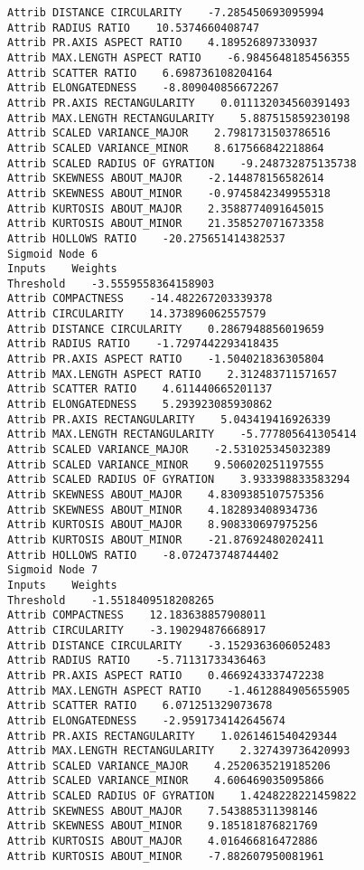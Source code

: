 \documentclass[
	article,			%
	11pt,				%
	oneside,			%
	a4paper,			%
	english,			%
	brazil,				%
	sumario=tradicional
	]{abntex2}
\begin{document}
\begin{lstlisting}
Attrib DISTANCE CIRCULARITY    -7.285450693095994
Attrib RADIUS RATIO    10.5374660408747
Attrib PR.AXIS ASPECT RATIO    4.189526897330937
Attrib MAX.LENGTH ASPECT RATIO    -6.9845648185456355
Attrib SCATTER RATIO    6.698736108204164
Attrib ELONGATEDNESS    -8.809040856672267
Attrib PR.AXIS RECTANGULARITY    0.011132034560391493
Attrib MAX.LENGTH RECTANGULARITY    5.887515859230198
Attrib SCALED VARIANCE_MAJOR    2.7981731503786516
Attrib SCALED VARIANCE_MINOR    8.617566842218864
Attrib SCALED RADIUS OF GYRATION    -9.248732875135738
Attrib SKEWNESS ABOUT_MAJOR    -2.144878156582614
Attrib SKEWNESS ABOUT_MINOR    -0.9745842349955318
Attrib KURTOSIS ABOUT_MAJOR    2.3588774091645015
Attrib KURTOSIS ABOUT_MINOR    21.358527071673358
Attrib HOLLOWS RATIO    -20.275651414382537
Sigmoid Node 6
Inputs    Weights
Threshold    -3.5559558364158903
Attrib COMPACTNESS    -14.482267203339378
Attrib CIRCULARITY    14.373896062557579
Attrib DISTANCE CIRCULARITY    0.2867948856019659
Attrib RADIUS RATIO    -1.7297442293418435
Attrib PR.AXIS ASPECT RATIO    -1.504021836305804
Attrib MAX.LENGTH ASPECT RATIO    2.312483711571657
Attrib SCATTER RATIO    4.611440665201137
Attrib ELONGATEDNESS    5.293923085930862
Attrib PR.AXIS RECTANGULARITY    5.043419416926339
Attrib MAX.LENGTH RECTANGULARITY    -5.777805641305414
Attrib SCALED VARIANCE_MAJOR    -2.531025345032389
Attrib SCALED VARIANCE_MINOR    9.506020251197555
Attrib SCALED RADIUS OF GYRATION    3.933398833583294
Attrib SKEWNESS ABOUT_MAJOR    4.8309385107575356
Attrib SKEWNESS ABOUT_MINOR    4.182893408934736
Attrib KURTOSIS ABOUT_MAJOR    8.908330697975256
Attrib KURTOSIS ABOUT_MINOR    -21.87692480202411
Attrib HOLLOWS RATIO    -8.072473748744402
Sigmoid Node 7
Inputs    Weights
Threshold    -1.5518409518208265
Attrib COMPACTNESS    12.183638857908011
Attrib CIRCULARITY    -3.190294876668917
Attrib DISTANCE CIRCULARITY    -3.1529363606052483
Attrib RADIUS RATIO    -5.71131733436463
Attrib PR.AXIS ASPECT RATIO    0.4669243337472238
Attrib MAX.LENGTH ASPECT RATIO    -1.4612884905655905
Attrib SCATTER RATIO    6.071251329073678
Attrib ELONGATEDNESS    -2.9591734142645674
Attrib PR.AXIS RECTANGULARITY    1.0261461540429344
Attrib MAX.LENGTH RECTANGULARITY    2.327439736420993
Attrib SCALED VARIANCE_MAJOR    4.2520635219185206
Attrib SCALED VARIANCE_MINOR    4.606469035095866
Attrib SCALED RADIUS OF GYRATION    1.4248228221459822
Attrib SKEWNESS ABOUT_MAJOR    7.543885311398146
Attrib SKEWNESS ABOUT_MINOR    9.185181876821769
Attrib KURTOSIS ABOUT_MAJOR    4.016466816472886
Attrib KURTOSIS ABOUT_MINOR    -7.882607950081961

\end{lstlisting}
\end{document}
